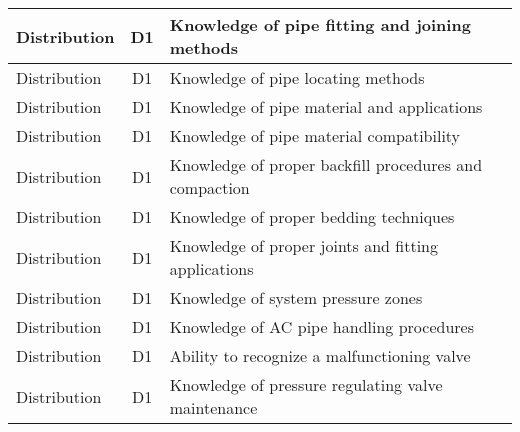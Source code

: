 \documentclass{article}
\begin{document}
\begin{table}[]
\begin{tabular}{|l|c|l|}
Distribution                           & D1             & Knowledge of pipe   fitting and joining methods                                                                                   \\ \hline
Distribution                           & D1             & Knowledge of pipe   locating methods                                                                                              \\ \hline
Distribution                           & D1             & Knowledge of pipe   material and applications                                                                                     \\ \hline
Distribution                           & D1             & Knowledge of pipe   material compatibility                                                                                        \\ \hline
Distribution                           & D1             & Knowledge of proper   backfill procedures and compaction                                                                          \\ \hline
Distribution                           & D1             & Knowledge of proper   bedding techniques                                                                                          \\ \hline
Distribution                           & D1             & Knowledge of proper   joints and fitting applications                                                                             \\ \hline
Distribution                           & D1             & Knowledge of system   pressure zones                                                                                              \\ \hline
Distribution                           & D1             & Knowledge of AC pipe   handling procedures                                                                                        \\ \hline
Distribution                           & D1             & Ability to recognize   a malfunctioning valve                                                                                     \\ \hline
Distribution                           & D1             & Knowledge of pressure   regulating valve maintenance                                                                              \\ \hline

\end{tabular}
\end{table}
\end{document}
